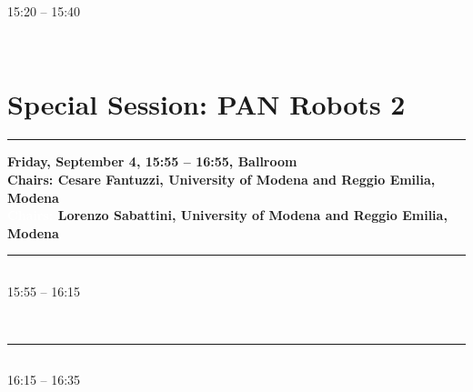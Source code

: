 	    15:20 -- 15:40 \nopagebreak

            
            \\ 
            
\section{{\bf \large Special Session: %
PAN Robots 2
}} \vspace{-15pt} %
\noindent\rule{\textwidth}{0.4pt} \nopagebreak
{\bf  
Friday, September 4, 15:55 -- 16:55, Ballroom
} \\ \nopagebreak
{\bf  Chairs: 
Cesare Fantuzzi, University of Modena and Reggio Emilia, Modena
} \\ \nopagebreak 
{\bf  \textcolor{white}{Chairs:} 
Lorenzo Sabattini, University of Modena and Reggio Emilia, Modena
} \\ \nopagebreak 
\noindent\rule{\textwidth}{0.4pt} \nopagebreak
            
\vspace*{-36pt}\subsection[ 
    	   {\bf Improved Autonomous Load Handling with Stereo Cameras
           } \\
           {\it Robert Varga, Arthur Costea, Sergiu Nedevschi
           }
	]
	    {
            }
	    15:55 -- 16:15 \nopagebreak

            
            \\ 
            \noindent\rule{\textwidth}{0.4pt}
\vspace*{-36pt}\subsection[ 
    	   {\bf Improving AGV Systems: Integration of Advanced Sensing and Control Technologies
           } \\
           {\it Fabio Oleari, Massimiliano Magnani, Davide Ronzoni, Lorenzo Sabattini, Elena Cardarelli, Valerio Digani, Cristian Secchi, Cesare Fantuzzi
           }
	]
	    {
            }
	    16:15 -- 16:35 \nopagebreak

